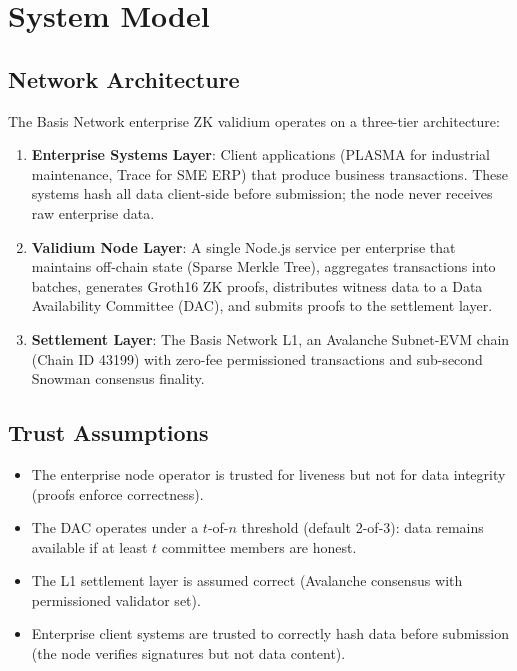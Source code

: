 
\section{System Model}

\subsection{Network Architecture}

The Basis Network enterprise ZK validium operates on a three-tier architecture:

\begin{enumerate}
\item \textbf{Enterprise Systems Layer}: Client applications (PLASMA for
  industrial maintenance, Trace for SME ERP) that produce business
  transactions. These systems hash all data client-side before submission;
  the node never receives raw enterprise data.

\item \textbf{Validium Node Layer}: A single Node.js service per enterprise
  that maintains off-chain state (Sparse Merkle Tree), aggregates
  transactions into batches, generates Groth16 ZK proofs, distributes
  witness data to a Data Availability Committee (DAC), and submits proofs
  to the settlement layer.

\item \textbf{Settlement Layer}: The Basis Network L1, an Avalanche
  Subnet-EVM chain (Chain ID 43199) with zero-fee permissioned transactions
  and sub-second Snowman consensus finality.
\end{enumerate}

\subsection{Trust Assumptions}

\begin{itemize}
\item The enterprise node operator is trusted for liveness but not for
  data integrity (proofs enforce correctness).
\item The DAC operates under a $t$-of-$n$ threshold (default 2-of-3):
  data remains available if at least $t$ committee members are honest.
\item The L1 settlement layer is assumed correct (Avalanche consensus
  with permissioned validator set).
\item Enterprise client systems are trusted to correctly hash data
  before submission (the node verifies signatures but not data content).
\end{itemize}

